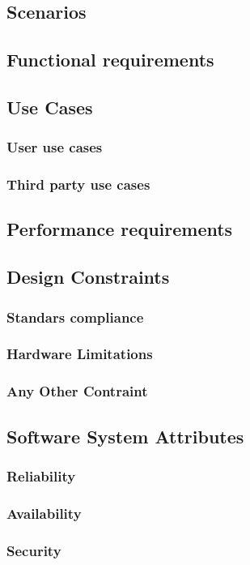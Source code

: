 \documentclass{article}
\begin{document}
\subsection{Scenarios}
\subsection{Functional requirements}
\subsection{Use Cases}
\subsubsection{User use cases}
\subsubsection{Third party use cases}

\subsection{Performance requirements}
\subsection{Design Constraints}
\subsubsection{Standars compliance}
\subsubsection{Hardware Limitations}
\subsubsection{Any Other Contraint}
\subsection{Software System Attributes}
\subsubsection{Reliability}
\subsubsection{Availability}
\subsubsection{Security}
\end{document}
